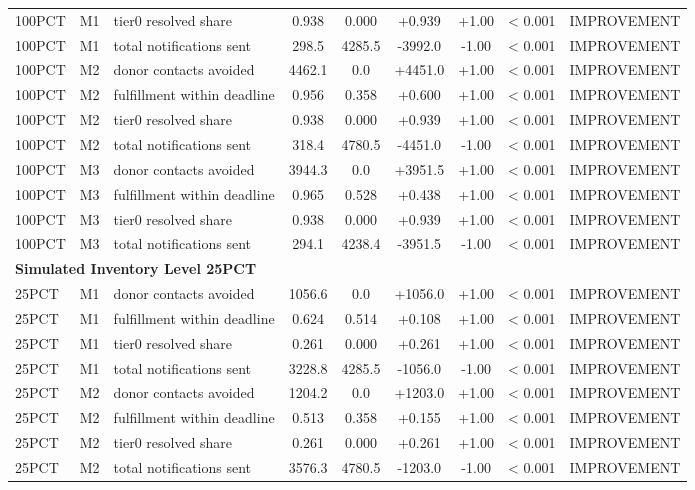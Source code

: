 \begin{table}[t]
\begin{tabular}{lllcccccl}
100PCT & M1 & tier0 resolved share & 0.938 & 0.000 & +0.939 & +1.00 & < 0.001 & IMPROVEMENT \\
100PCT & M1 & total notifications sent & 298.5 & 4285.5 & -3992.0 & -1.00 & < 0.001 & IMPROVEMENT \\
100PCT & M2 & donor contacts avoided & 4462.1 & 0.0 & +4451.0 & +1.00 & < 0.001 & IMPROVEMENT \\
100PCT & M2 & fulfillment within deadline & 0.956 & 0.358 & +0.600 & +1.00 & < 0.001 & IMPROVEMENT \\
100PCT & M2 & tier0 resolved share & 0.938 & 0.000 & +0.939 & +1.00 & < 0.001 & IMPROVEMENT \\
100PCT & M2 & total notifications sent & 318.4 & 4780.5 & -4451.0 & -1.00 & < 0.001 & IMPROVEMENT \\
100PCT & M3 & donor contacts avoided & 3944.3 & 0.0 & +3951.5 & +1.00 & < 0.001 & IMPROVEMENT \\
100PCT & M3 & fulfillment within deadline & 0.965 & 0.528 & +0.438 & +1.00 & < 0.001 & IMPROVEMENT \\
100PCT & M3 & tier0 resolved share & 0.938 & 0.000 & +0.939 & +1.00 & < 0.001 & IMPROVEMENT \\
100PCT & M3 & total notifications sent & 294.1 & 4238.4 & -3951.5 & -1.00 & < 0.001 & IMPROVEMENT \\
\midrule
\multicolumn{9}{l}{\textbf{Simulated Inventory Level 25PCT}} \\
\midrule
25PCT & M1 & donor contacts avoided & 1056.6 & 0.0 & +1056.0 & +1.00 & < 0.001 & IMPROVEMENT \\
25PCT & M1 & fulfillment within deadline & 0.624 & 0.514 & +0.108 & +1.00 & < 0.001 & IMPROVEMENT \\
25PCT & M1 & tier0 resolved share & 0.261 & 0.000 & +0.261 & +1.00 & < 0.001 & IMPROVEMENT \\
25PCT & M1 & total notifications sent & 3228.8 & 4285.5 & -1056.0 & -1.00 & < 0.001 & IMPROVEMENT \\
25PCT & M2 & donor contacts avoided & 1204.2 & 0.0 & +1203.0 & +1.00 & < 0.001 & IMPROVEMENT \\
25PCT & M2 & fulfillment within deadline & 0.513 & 0.358 & +0.155 & +1.00 & < 0.001 & IMPROVEMENT \\
25PCT & M2 & tier0 resolved share & 0.261 & 0.000 & +0.261 & +1.00 & < 0.001 & IMPROVEMENT \\
25PCT & M2 & total notifications sent & 3576.3 & 4780.5 & -1203.0 & -1.00 & < 0.001 & IMPROVEMENT \\

\end{tabular}
\end{table}
